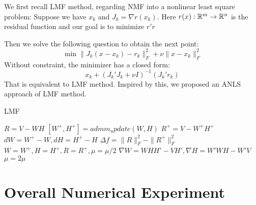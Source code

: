 \documentclass{article}
\renewcommand{\grad}{\nabla}
\begin{document}
We first recall LMF method, regarding NMF into a nonlinear least square problem: 
Suppose we have $x_k$ and $J_k = \grad r(x_k)$. Here $r(x) : \mathbb R^m \to \mathbb R^n$ is the residual function and our goal is to minimize $r'r$

Then we solve the following question to obtain the next point:
$$\min \|J_k(x-x_k) - r_k\|_F^2 + \nu \|x-x_k\|_F^2$$
Without constraint, the minimizer has a closed form:
$$ x_k + (J_k'J_k + \nu I)^{-1}(J_k'r_k)$$
That is equivalent to LMF method. Inspired by this, we proposed an ANLS approach of LMF method.

\begin{algorithm}
	\caption{LMF}
	\begin{algorithmic}[1]
		\STATE $R = V - WH$
		\STATE $[W^+, H^+] = admm_update(W,H)$
		\STATE $R^+ = V - W^+H^+$
		\STATE $dW = W^+ - W, dH = H^+-H$
		\STATE $\Delta f = \|R\|_F^2 - \|R^+\|_F^2$
		\STATE $W = W^+, H = H^+, R = R^+, \mu = \mu/2$
		\STATE $\grad W = WHH'-VH', \grad H = W'WH-W'V$
		\ELSE
		\STATE $\mu = 2\mu$
		\ENDIF
		\ENDFOR
	\end{algorithmic}
\end{algorithm}
\section{Overall Numerical Experiment}
\end{document}
